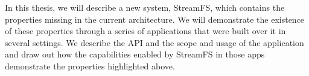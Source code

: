 In this thesis, we will describe a new system, StreamFS, which contains the properties missing in the current architecture.  We will demonstrate 
the existence of these properties through a series of applications that were built over it in several settings.  We describe the API and
the scope and usage of the application and draw out how the capabilities enabled by StreamFS in those apps demonstrate the properties highlighted
above.
































